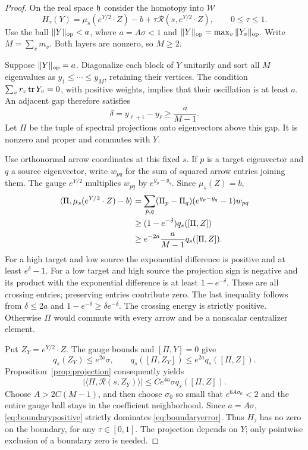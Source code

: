 \begin{proof}
On the real space $\mathfrak h$ consider the homotopy into $\mathcal W$
\begin{equation}\label{eq:homotopy}
H_\tau(Y)=\mu_s(e^{Y/2}\cdot Z)-b+
\tau\mathcal R(s,e^{Y/2}\cdot Z),\qquad 0\le\tau\le1.
\end{equation}
Use the ball $\|Y\|_{\mathrm{op}}<a$, where $a=A\sigma<1$ and
$\|Y\|_{\mathrm{op}}=\max_v\|Y_v\|_{\mathrm{op}}$. Write
$M=\sum_vm_v$. Both layers are nonzero, so $M\ge2$.

Suppose $\|Y\|_{\mathrm{op}}=a$. Diagonalize each block of $Y$ unitarily
and sort all $M$ eigenvalues as $y_1\le\cdots\le y_M$, retaining
their vertices. The condition $\sum_vr_v\operatorname{tr} Y_v=0$, with positive
weights, implies that their oscillation is at least $a$. An adjacent
gap therefore satisfies
\begin{equation}\label{eq:gapchoice}
\delta=y_{\ell+1}-y_\ell\ge\frac{a}{M-1}.
\end{equation}
Let $\Pi$ be the tuple of spectral projections onto eigenvectors
above this gap. It is nonzero and proper and commutes with $Y$.

Use orthonormal arrow coordinates at this fixed $s$. If $p$ is a
target eigenvector and $q$ a source eigenvector, write $w_{pq}$ for
the sum of squared arrow entries joining them. The gauge
$e^{Y/2}$ multiplies $w_{pq}$ by $e^{y_p-y_q}$. Since $\mu_s(Z)=b$,
\begin{align}
\langle\Pi,\mu_s(e^{Y/2}\cdot Z)-b\rangle
&=\sum_{p,q}(\Pi_p-\Pi_q)(e^{y_p-y_q}-1)w_{pq}\notag\\
&\ge(1-e^{-\delta})q_s([\Pi,Z])\notag\\
&\ge e^{-2a}\frac{a}{M-1}q_s([\Pi,Z]).\label{eq:boundarypositive}
\end{align}
For a high target and low source the exponential difference is
positive and at least $e^\delta-1$. For a low target and high
source the projection sign is negative and its product with the
exponential difference is at least $1-e^{-\delta}$. These are all
crossing entries; preserving entries contribute zero. The last
inequality follows from $\delta\le2a$ and
$1-e^{-\delta}\ge\delta e^{-\delta}$.
The crossing energy is strictly positive. Otherwise $\Pi$ would
commute with every arrow and be a nonscalar centralizer element.

Put $Z_Y=e^{Y/2}\cdot Z$. The gauge bounds and $[\Pi,Y]=0$ give
\begin{equation}\label{eq:crossingbounds}
q_s(Z_Y)\le e^{2a}\sigma,\qquad
q_s([\Pi,Z_Y])\le e^{2a}q_s([\Pi,Z]).
\end{equation}
Proposition~\ref{prop:projection} consequently yields
\begin{equation}\label{eq:boundaryerror}
|\langle\Pi,\mathcal R(s,Z_Y)\rangle|
\le Ce^{4a}\sigma q_s([\Pi,Z]).
\end{equation}
Choose $A>2C(M-1)$, and then choose $\sigma_0$ so small that
$e^{6A\sigma_0}<2$ and the entire gauge ball stays in the
coefficient neighborhood. Since $a=A\sigma$,
\eqref{eq:boundarypositive} strictly dominates
\eqref{eq:boundaryerror}. Thus $H_\tau$ has no zero on the
boundary, for any $\tau\in[0,1]$. The projection depends on $Y$;
only pointwise exclusion of a boundary zero is needed.


\end{proof}
